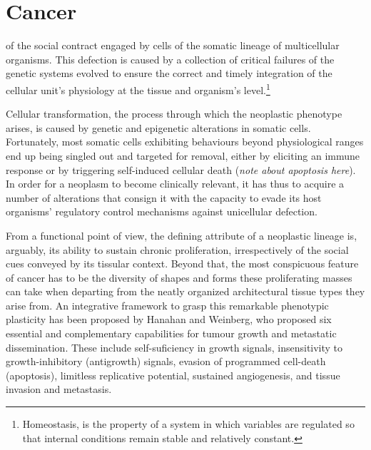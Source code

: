 \documentclass{tufte-book}
\begin{document}
\section{Cancer}

 of the social contract engaged by cells of the
somatic lineage of multicellular organisms.  This defection is caused by a
collection of critical failures of the genetic systems evolved to ensure the
correct and timely integration of the cellular unit's physiology at the tissue
and organism's level.\footnote{Homeostasis, is the property of a system in which
  variables are regulated so that internal conditions remain stable and
  relatively constant.}

\bigskip

Cellular transformation, the process through which the neoplastic phenotype
arises, is caused by genetic and epigenetic alterations in somatic cells.
Fortunately, most somatic cells exhibiting behaviours beyond physiological
ranges end up being singled out and targeted for removal, either by eliciting an
immune response or by triggering self-induced cellular death (\emph{note about
  apoptosis here}).  In order for a neoplasm to become clinically relevant, it
has thus to acquire a number of alterations that consign it with the capacity to
evade its host organisms' regulatory control mechanisms against unicellular
defection.



From a functional point of view, the defining attribute of a neoplastic lineage
is, arguably, its ability to sustain chronic proliferation, irrespectively of
the social cues conveyed by its tissular context.  Beyond that, the most
conspicuous feature of cancer has to be the diversity of shapes and forms these
proliferating masses can take when departing from the neatly organized
architectural tissue types they arise from.  An integrative framework to grasp
this remarkable phenotypic plasticity has been proposed by Hanahan and
Weinberg,\cite{hanahan_hallmarks_2000,hanahan_hallmarks_2011} who proposed six
essential and complementary capabilities for tumour growth and metastatic
dissemination.  These include self-suficiency in growth signals, insensitivity
to growth-inhibitory (antigrowth) signals, evasion of programmed cell-death
(apoptosis), limitless replicative potential, sustained angiogenesis, and tissue
invasion and metastasis.
\end{document}
